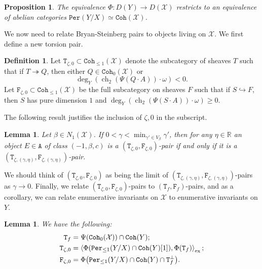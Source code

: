 \documentclass{amsart}
\newtheorem{prop}[thm]{Proposition}
\newtheorem{lem}[thm]{Lemma}
\theoremstyle{definition}
\newtheorem{defn}[thm]{Definition}
\theoremstyle{remark}
\theoremstyle{plain}
\theoremstyle{definition}
\theoremstyle{remark}
\newcommand{\R}{\mathbb{R}}
\newcommand{\mc}[1]{\mathcal{#1}}
\newcommand{\mr}[1]{\mathrm{#1}}
\newcommand{\on}[1]{\operatorname{#1}}
\newcommand{\mt}[1]{\mathtt{#1}}
\newcommand{\1}{\mathbf{1}}
\newcommand{\2}{\mathbf{2}}
\newcommand{\3}{\mathbf{3}}
\begin{document}
\begin{prop}
    The equivalence $\Phi \colon D(Y) \to D(\mc{X})$ restricts to an equivalence of abelian categories $\mt{Per}(Y/X) \simeq \mt{Coh}(\mc{X})$.
\end{prop}

We now need to relate Bryan-Steinberg pairs to objects living on $\mc{X}$. We first define a new torsion pair.

\begin{defn}
    Let $\mt{T}_{\zeta, 0} \subset \mt{Coh}_{\leq 1}(\mc{X})$ denote the subcategory of sheaves $T$ such that if $T \twoheadrightarrow Q$, then either $Q \in \mt{Coh}_0(\mc{X})$ or 
    \[ \deg_Y(\on{ch}_2(\Psi(Q \cdot A)) \cdot \omega) < 0. \]
    Let $\mt{F}_{\zeta, 0} \subset \mt{Coh}_{\leq 1}(\mc{X})$ be the full subcategory on sheaves $F$ such that if $S \hookrightarrow F$, then $S$ has pure dimension $1$ and $\deg_Y(\on{ch}_2(\Psi(S \cdot A)) \cdot \omega) \geq 0$.
\end{defn}

The following result justifies the inclusion of $\zeta, 0$ in the subscript.
\begin{lem}
    Let $\beta \in N_1(\mc{X})$. If $0 < \gamma < \min_{\gamma'\in V_{\beta}} \gamma'$, then for any $\eta \in \R$ an object $E \in \mt{A}$ of class $(-1, \beta, c)$ is a $(\mt{T}_{\zeta, 0}, \mt{F}_{\zeta, 0})$-pair if and only if it is a $(\mt{T}_{\zeta, (\gamma, \eta)}, \mt{F}_{\zeta, (\gamma, \eta)})$-pair.
\end{lem}

We should think of $(\mt{T}_{\zeta, 0}, \mt{F}_{\zeta, 0})$ as being the limit of $(\mt{T}_{\zeta, (\gamma, \eta)}, \mt{F}_{\zeta, (\gamma, \eta)})$-pairs as $\gamma \to 0$. Finally, we relate $(\mt{T}_{\zeta, 0}, \mt{F}_{\zeta, 0})$-pairs to $(\mt{T}_f, \mt{F}_f)$-pairs, and as a corollary, we can relate enumerative invariants on $\mc{X}$ to enumerative invariants on $Y$.

\begin{lem}
    We have the following:
    \begin{align*}
        \mt{T}_f &= \Psi(\mt{Coh}_0(\mc{X})) \cap \mt{Coh}(Y); \\
        \mt{T}_{\zeta, 0} &= \ev{\Phi(\mt{Per}_{\leq 1}(Y/X) \cap \mt{Coh}(Y)[1]), \Phi(\mt{T}_f)}_{\mr{ex}}; \\
        \mt{F}_{\zeta, 0} &= \Phi\qty(\mt{Per}_{\leq 1}(Y/X) \cap \mt{Coh}(Y) \cap \mt{T}_f^{\perp}).
    \end{align*}
\end{lem}
\end{document}
